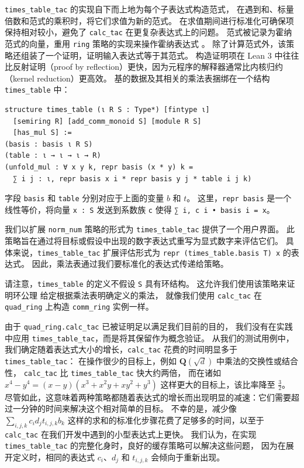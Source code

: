 \documentclass[sigplan,10pt,nonacm,
screen]{acmart} \settopmatter{printfolios=true,printccs=false,printacmref=false}
\newcommand{\QQ}{\mathbf{Q}}
\begin{document}
\lstinline{times_table_tac} 的实现自下而上地为每个子表达式构造范式，
在遇到和、标量倍数和范式的乘积时，将它们求值为新的范式。
在求值期间进行标准化可确保项保持相对较小，避免了 \lstinline{calc_tac} 在更复杂表达式上的问题。
范式被记录为霍纳范式的向量，重用 \lstinline{ring} 策略的实现来操作霍纳表达式 \cite{ring-tactic}。
除了计算范式外，该策略还组装了一个证明，证明输入表达式等于其范式。
构造证明项在 Lean 3 中往往比反射证明（proof by reflection）更快，因为元程序的解释器通常比内核归约（kernel reduction）更高效。
基的数据及其相关的乘法表捆绑在一个结构 \lstinline{times_table} 中：
\begin{lstlisting}
structure times_table (ι R S : Type*) [fintype ι]
  [semiring R] [add_comm_monoid S] [module R S]
  [has_mul S] :=
(basis : basis ι R S)
(table : ι → ι → ι → R)
(unfold_mul : ∀ x y k, repr basis (x * y) k =
  ∑ i j : ι, repr basis x i * repr basis y j * table i j k)
\end{lstlisting}
字段 \lstinline{basis} 和 \lstinline{table} 分别对应于上面的变量 $b$ 和 $t$。
这里，\lstinline{repr basis} 是一个线性等价，将向量 \lstinline{x : S} 发送到系数族 \lstinline{c}
使得 \lstinline{∑ i, c i • basis i = x}。

我们以扩展 \lstinline{norm_num} 策略的形式为 \lstinline{times_table_tac} 提供了一个用户界面。
此策略旨在通过将目标或假设中出现的数字表达式重写为显式数字来评估它们。
具体来说，\lstinline{times_table_tac} 扩展评估形式为 \lstinline{repr (times_table.basis T) x} 的表达式。
因此，乘法表通过我们要标准化的表达式传递给策略。

请注意，\lstinline{times_table} 的定义不假设 \lstinline{S} 具有环结构。
这允许我们使用该策略来证明环公理
给定根据乘法表明确定义的乘法，
就像我们使用 \lstinline{calc_tac} 在 \lstinline{quad_ring} 上构造 \lstinline{comm_ring} 实例一样。

由于 \lstinline{quad_ring.calc_tac} 已被证明足以满足我们目前的目的，
我们没有在实践中应用 \lstinline{times_table_tac}，而是将其保留作为概念验证。
从我们的测试用例中，我们确定随着表达式大小的增长，\lstinline{calc_tac} 花费的时间明显多于 \lstinline{times_table_tac}：
在操作很少的目标上，例如 $\QQ(\sqrt{d})$ 中乘法的交换性或结合性，
\lstinline{calc_tac} 比 \lstinline{times_table_tac} 快大约两倍，
而在诸如 $x^4 - y^4 = (x - y) (x^3 + x^2 y + x y^2 + y^3)$ 这样更大的目标上，该比率降至 $\frac{3}{2}$。
尽管如此，这意味着两种策略都随着表达式的增长而出现明显的减速：它们需要超过一分钟的时间来解决这个相对简单的目标。
不幸的是，减少像 $\sum_{i, j, k} c_i d_j t_{i, j, k} b_k$ 这样的求和的标准化步骤花费了足够多的时间，以至于 \lstinline{calc_tac} 在我们开发中遇到的小型表达式上更快。
我们认为，在实现 \lstinline{times_table_tac} 的完整化身时，良好的缓存策略可以解决这些问题，
因为在展开定义时，相同的表达式 $c_i$、$d_j$ 和 $t_{i, j, k}$ 会倾向于重新出现。
\end{document}
